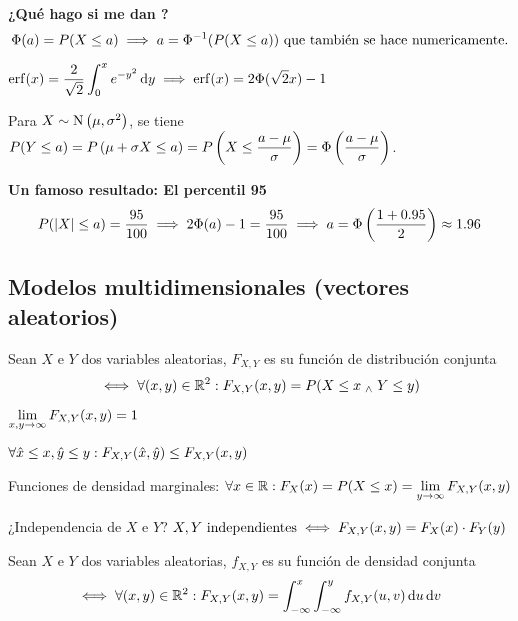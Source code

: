 \textbf{¿Qué hago si me dan ?}
\[\Phi(a) = P(X\leq a) \implies a = \Phi^{-1}(P(X\leq a)) \text{ que también se hace numericamente.}\]

\begin{obs}
	$ \ds \operatorname{erf} (x) = \frac{2}{\sqrt{2}} \int_{0}^{x} e^{-y^2} \odif{y} \implies \operatorname{erf} (x) = 2 \Phi(\sqrt{2}x) - 1$
\end{obs}

Para $X\sim\operatorname{N}\left(\mu, \sigma^2\right)$, se tiene $\displaystyle P(Y\leq a) = P\left(\mu + \sigma X \leq a\right) = P\left(X\leq \frac{a-\mu}{\sigma}\right) = \Phi\left(\frac{a-\mu}{\sigma}\right)$.

\textbf{Un famoso resultado: El percentil 95}
\[P(\left|X\right| \leq a) = \frac{95}{100} \implies 2\Phi(a) - 1 = \frac{95}{100} \implies a = \Phi\left(\frac{1+ 0.95}{2}\right) \approx 1.96\]

\subsection{Modelos multidimensionales (vectores aleatorios)}

\begin{defn}
	Sean $X$ e $Y$ dos variables aleatorias, $F_{X, Y}$ es su función de distribución conjunta
	\[\iff \forall (x, y) \in \mathbb{R}^2 : F_{X, Y}(x, y) = P(X \leq x \; _{\wedge} \; Y \leq y)\]

\end{defn}

\begin{obs}
	\begin{itemize*}[itemjoin=\hspace{1cm}]
		\item $\displaystyle \lim_{x, y \to \infty} F_{X, Y}(x, y) = 1$
		\item $\displaystyle\forall \hat{x} \leq x, \hat{y} \leq y : F_{X, Y} (\hat{x}, \hat{y}) \leq F_{X, Y} (x, y)$
	\end{itemize*}
\end{obs}

Funciones de densidad marginales: $\displaystyle \forall x \in \mathbb{R} : F_X(x) = P(X \leq x) = \lim_{y \to \infty} F_{X, Y} (x, y)$

¿Independencia de $X$ e $Y$? $\displaystyle X, Y \text{ independientes} \iff F_{X, Y}(x, y) = F_X(x) \cdot F_Y(y)$

\begin{defn}
	Sean $X$ e $Y$ dos variables aleatorias, $f_{X, Y}$ es su función de densidad conjunta
	\[\iff \forall (x, y) \in \R^2 : F_{X, Y}(x, y) = \int_{-\infty}^{x} \int_{-\infty}^{y} f_{X, Y}(u, v) \odif{u} \odif{v}\]
\end{defn}

